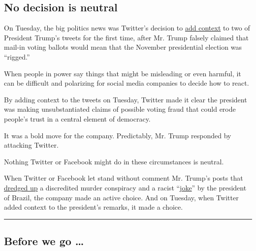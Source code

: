 \hypertarget{no-decision-is-neutral}{%
\subsection{No decision is neutral}\label{no-decision-is-neutral}}

On Tuesday, the big politics news was Twitter's decision to
\href{https://www.nytimes.com/2020/05/26/technology/twitter-trump-mail-in-ballots.html}{add
context} to two of President Trump's tweets for the first time, after
Mr. Trump falsely claimed that mail-in voting ballots would mean that
the November presidential election was ``rigged.''

When people in power say things that might be misleading or even
harmful, it can be difficult and polarizing for social media companies
to decide how to react.

By adding context to the tweets on Tuesday, Twitter made it clear the
president was making unsubstantiated claims of possible voting fraud
that could erode people's trust in a central element of democracy.

It was a bold move for the company. Predictably, Mr. Trump responded by
attacking Twitter.

Nothing Twitter or Facebook might do in these circumstances is neutral.

When Twitter or Facebook let stand without comment Mr. Trump's posts
that
\href{https://www.nytimes.com/2020/05/26/us/politics/klausutis-letter-jack-dorsey.html}{dredged
up} a discredited murder conspiracy and a racist
``\href{https://www.theguardian.com/world/2020/jan/24/jair-bolsonaro-racist-comment-sparks-outrage-indigenous-groups}{joke}''
by the president of Brazil, the company made an active choice. And on
Tuesday, when Twitter added context to the president's remarks, it made
a choice.

\begin{center}\rule{0.5\linewidth}{\linethickness}\end{center}

\hypertarget{before-we-go-}{%
\subsection{Before we go \ldots{}}\label{before-we-go-}}

